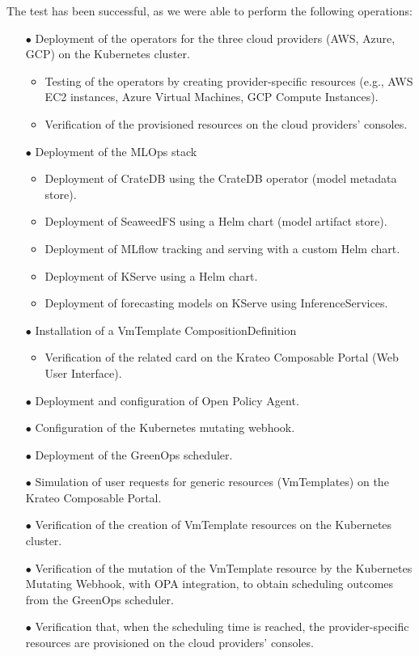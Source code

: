 The test has been successful, as we were able to perform the following operations:
\begin{itemize}[itemsep=0.2pt, topsep=1pt]
    \item[$\bullet$] Deployment of the operators for the three cloud providers (AWS, Azure, GCP) on the Kubernetes cluster.
    \begin{itemize}[label=$\circ$]
        \item Testing of the operators by creating provider-specific resources (e.g., AWS EC2 instances, Azure Virtual Machines, GCP Compute Instances).
        \item Verification of the provisioned resources on the cloud providers' consoles.
    \end{itemize}
    \item[$\bullet$] Deployment of the MLOps stack
    \begin{itemize}[label=$\circ$]
        \item Deployment of CrateDB using the CrateDB operator (model metadata store).
        \item Deployment of SeaweedFS using a Helm chart (model artifact store).
        \item Deployment of MLflow tracking and serving with a custom Helm chart.
        \item Deployment of KServe using a Helm chart.
        \item Deployment of forecasting models on KServe using InferenceServices.
    \end{itemize}
    \item[$\bullet$] Installation of a VmTemplate CompositionDefinition
    \begin{itemize}[label=$\circ$]
        \item Verification of the related card on the Krateo Composable Portal (Web User Interface).
    \end{itemize}
    \item[$\bullet$] Deployment and configuration of Open Policy Agent.
    \item[$\bullet$] Configuration of the Kubernetes mutating webhook.
    \item[$\bullet$] Deployment of the GreenOps scheduler.
    \item[$\bullet$] Simulation of user requests for generic resources (VmTemplates) on the Krateo Composable Portal.
    \item[$\bullet$] Verification of the creation of VmTemplate resources on the Kubernetes cluster.
    \item[$\bullet$] Verification of the mutation of the VmTemplate resource by the Kubernetes Mutating Webhook, with OPA integration, to obtain scheduling outcomes from the GreenOps scheduler.
    \item[$\bullet$] Verification that, when the scheduling time is reached, the provider-specific resources are provisioned on the cloud providers' consoles.
\end{itemize}


